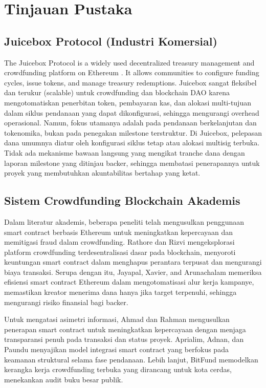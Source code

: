 \documentclass[conference]{IEEEtran}
\begin{document}
\section{Tinjauan Pustaka}

\subsection{Juicebox Protocol (Industri Komersial)}
The Juicebox Protocol is a widely used decentralized treasury management and crowdfunding platform on Ethereum \cite{juicebox}. It allows communities to configure funding cycles, issue tokens, and manage treasury redemptions. Juicebox sangat fleksibel dan terukur (scalable) untuk crowdfunding dan blockchain DAO karena mengotomatiskan penerbitan token, pembayaran kas, dan alokasi multi-tujuan dalam siklus pendanaan yang dapat dikonfigurasi, sehingga mengurangi overhead operasional. Namun, fokus utamanya adalah pada pendanaan berkelanjutan dan tokenomika, bukan pada penegakan milestone terstruktur. Di Juicebox, pelepasan dana umumnya diatur oleh konfigurasi siklus tetap atau alokasi multisig terbuka. Tidak ada mekanisme bawaan langsung yang mengikat tranche dana dengan laporan milestone yang ditinjau backer, sehingga membatasi penerapannya untuk proyek yang membutuhkan akuntabilitas bertahap yang ketat.

\subsection{Sistem Crowdfunding Blockchain Akademis}
Dalam literatur akademis, beberapa peneliti telah mengusulkan penggunaan smart contract berbasis Ethereum untuk meningkatkan kepercayaan dan memitigasi fraud dalam crowdfunding. Rathore dan Rizvi \cite{rathore2023decentralized} mengeksplorasi platform crowdfunding terdesentralisasi dasar pada blockchain, menyoroti keuntungan smart contract dalam menghapus perantara terpusat dan mengurangi biaya transaksi. Serupa dengan itu, Jayapal, Xavier, and Arunachalam \cite{jayapal2023capitalizing} memeriksa efisiensi smart contract Ethereum dalam mengotomatisasi alur kerja kampanye, memastikan kreator menerima dana hanya jika target terpenuhi, sehingga mengurangi risiko finansial bagi backer.

Untuk mengatasi asimetri informasi, Ahmad dan Rahman \cite{ahmad2021applying} mengusulkan penerapan smart contract untuk meningkatkan kepercayaan dengan menjaga transparansi penuh pada transaksi dan status proyek. Aprialim, Adnan, dan Paundu \cite{aprialim2021penerapan} menyajikan model integrasi smart contract yang berfokus pada keamanan struktural selama fase pendanaan. Lebih lanjut, BitFund \cite{bitfund2020} memodelkan kerangka kerja crowdfunding terbuka yang dirancang untuk kota cerdas, menekankan audit buku besar publik.
\end{document}
